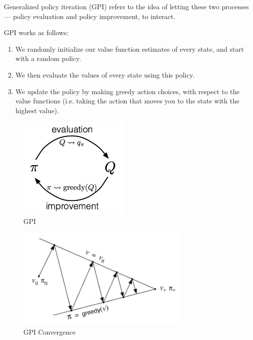 Generalized policy iteration (GPI) refers to the idea of letting these two processes — policy evaluation and policy improvement, to interact.

GPI works as follows:
\begin{enumerate}
    \item We randomly initialize our value function estimates of every state, and start with a random policy.

    \item We then evaluate the values of every state using this policy.

    \item We update the policy by making greedy action choices, with respect to the value functions (i.e. taking the action that moves you to the state with the highest value).
\end{enumerate}

\begin{table}[h]
    \begin{minipage}{0.35\linewidth}
        \begin{figure}[H]
            \centering
            \includegraphics[height=5cm,width=\linewidth,keepaspectratio]{Pictures/deep-reinforcement-learning/gpi-1.jpg}
            \caption{GPI}
        \end{figure}
    \end{minipage}
    \hfill
    \begin{minipage}{0.65\linewidth}
        \begin{figure}[H]
            \centering
            \includegraphics[height=5cm,width=\linewidth,keepaspectratio]{Pictures/deep-reinforcement-learning/gpi-2.jpg}
            \caption{GPI Convergence}
        \end{figure}
    \end{minipage}
\end{table}


